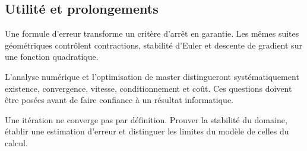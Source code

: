 \documentclass[../cours_1re.tex]{subfiles}
\begin{document}
\begin{finchapitre}
\section{Utilité et prolongements}
Une formule d'erreur transforme un critère d'arrêt en garantie.
Les mêmes suites géométriques contrôlent contractions, stabilité d'Euler
et descente de gradient sur une fonction quadratique.

L'analyse numérique et l'optimisation de master distingueront systématiquement
existence, convergence, vitesse, conditionnement et coût. Ces questions
doivent être posées avant de faire confiance à un résultat informatique.
\begin{retenir}
Une itération ne converge pas par définition. Prouver la stabilité du domaine,
établir une estimation d'erreur et distinguer les limites du modèle de celles du calcul.
\end{retenir}
\end{finchapitre}
\end{document}
